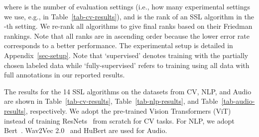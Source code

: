 \documentclass{article}
\begin{document}
where  is the number of evaluation settings (i.e., how many experimental settings we use, e.g.,  in Table~\ref{tab-cv-results}), and  is the rank of an SSL algorithm in the -th setting.
We re-rank all algorithms to give final ranks based on their Friedman rankings.
Note that all ranks are in ascending order because the lower error rate corresponds to a better performance. The experimental setup is detailed in Appendix~\ref{sec-setup}. Note that `supervised' denotes training with the partially chosen labeled data while `fully-supervised' refers to training using all data with full annotations in our reported results.







The results for the 14 SSL algorithms on the datasets from CV, NLP, and Audio are shown in Table~\ref{tab-cv-results}, Table~\ref{tab-nlp-results}, and Table~\ref{tab-audio-results}, respectively. We adopt the pre-trained Vision Transformers (ViT)~\cite{vaswani2017attention,dosovitskiy2020image,bert,baevski2020wav2vec} instead of training ResNets~\cite{he2016deep} from scratch for CV tasks. For NLP, we adopt Bert~\cite{bert}. Wav2Vec 2.0~\cite{baevski2020wav2vec} and HuBert \cite{hsu2021hubert} are used for Audio. 
\end{document}
